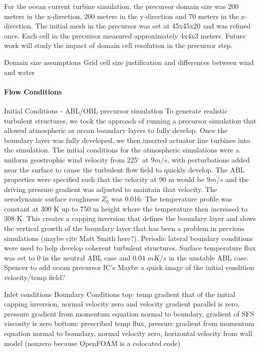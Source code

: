 \documentclass[12pt,letterpaper]{article}
\begin{document}
For the ocean current turbine simulation, the precursor domain size was 200 meters in the x-direction, 200 meters in the y-direction and 70 meters in the z-direction. The initial mesh in the precursor was set at 45x45x20 and was refined once. Each cell in the precursor measured approximately 4x4x3 meters. Future work will study the impact of domain cell resolution in the precursor step.


Domain size assumptions
Grid cell size justification and differences between wind and water

\paragraph{Flow Conditions}

Initial Conditions - ABL/OBL precursor simulation
To generate realistic turbulent structures, we took the approach of running a precursor simulation that allowed atmospheric or ocean boundary layers to fully develop.  Once the boundary layer was fully developed, we then inserted actuator line turbines into the simulation.  The initial conditions for the atmospheric simulations were a uniform geostrophic wind velocity from 225$^\circ$  at $9 m/s$, with perturbations added near the surface to cause the turbulent flow field to quickly develop.  The ABL properties were specified such that the velocity at 90 m would be $9 m/s$ and the driving pressure gradient was adjusted to maintain that velocity.  The aerodynamic surface roughness $Z_{0}$ was 0.016.  The temperature profile was constant at 300 K up to 750 m height where the temperature then increased to 308 K.  This creates a capping inversion that defines the boundary layer and slows the vertical growth of the boundary layer that has been a problem in previous simulations (maybe cite Matt Smith here?).  Periodic lateral boundary conditions were used to help develop coherent turbulent structures.  Surface temperature flux was set to 0 in the neutral ABL case and $0.04$ $mK/s$ in the unstable ABL case.
%
Spencer to add ocean precursor IC's
Maybe a quick image of the initial condition velocity/temp field?

Inlet conditions
Boundary Conditions
top: temp gradient that of the initial capping inversion, normal velocity zero and velocity gradient parallel is zero, pressure gradient from momentum equation normal to boundary, gradient of SFS viscosity is zero
bottom: prescribed temp flux, pressure gradient from momentum equation normal to boundary, normal velocity zero, horizontal velocity from wall model (nonzero because OpenFOAM is a colocated code)
\end{document}
